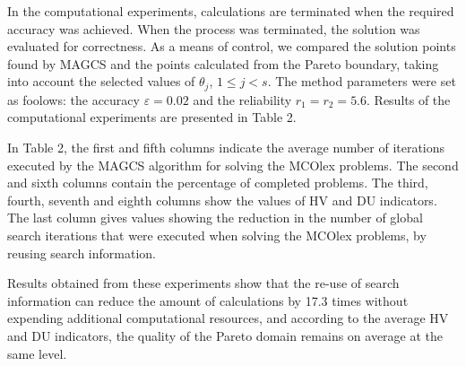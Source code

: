 \documentclass[smallextended]{svjour3}       %
\begin{document}
In the computational experiments, calculations are terminated when the required accuracy was achieved. When the process was terminated, the solution was evaluated for correctness. As a means of control, we compared the solution points found by MAGCS and the points calculated from the Pareto boundary, taking into account the selected values of $\theta_j$, $1 \leq j < s$. The method parameters were set as foolows: the accuracy $\varepsilon = 0.02$ and the reliability $r_1=r_2=5.6$. Results of the computational experiments are presented in Table 2.

In Table 2, the first and fifth columns indicate the average number of iterations executed by the MAGCS algorithm for solving the MCOlex problems. The second and sixth columns contain the percentage of completed problems. The third, fourth, seventh and eighth columns show the values of HV and DU indicators. The last column gives values showing the reduction in the number of global search iterations that were executed when solving the MCOlex problems, by reusing search information.


\begin{table}[ht]
\centering
\caption{Results of the series of experiments to solve two-dimensional two-criteria MCO problems}
\label{tab:2}
\end{table}


Results obtained from these experiments show that the re-use of search information can reduce the amount of calculations by 17.3 times without expending additional computational resources, and according to the average HV and DU indicators, the quality of the Pareto domain remains on average at the same level.
\end{document}

